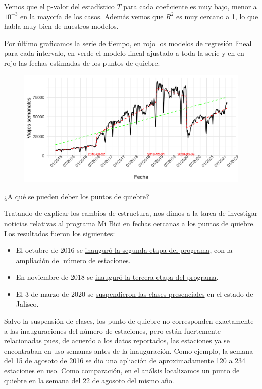 \documentclass[
]{article}
\begin{document}
Vemos que el p-valor del estadístico \(T\) para cada coeficiente es muy
bajo, menor a \(10^{-3}\) en la mayoría de los casos. Además vemos que
\(R^2\) es muy cercano a 1, lo que habla muy bien de nuestros modelos.

Por último graficamos la serie de tiempo, en rojo los modelos de
regresión lineal para cada intervalo, en verde el modelo lineal ajustado
a toda la serie y en en rojo las fechas estimadas de los puntos de
quiebre.

\begin{figure}
\centering
\includegraphics[width=12cm]{../plots/serie_breaks.png}
\end{figure}

¿A qué se pueden deber los puntos de quiebre?

Tratando de explicar los cambios de estructura, nos dimos a la tarea de
investigar noticias relativas al programa Mi Bici en fechas cercanas a
los puntos de quiebre. Los resultados fueron los siguientes:

\begin{itemize}
\item
  El octubre de 2016 se
  \href{https://www.informador.mx/Jalisco/Inauguran-segunda-etapa-de-MiBici-20161027-0035.html}{inauguró
  la segunda etapa del programa}, con la ampliación del número de
  estaciones.
\item
  En noviembre de 2018 se
  \href{https://www.eloccidental.com.mx/local/inauguran-tercera-etapa-de-mibici-2714371.html}{inauguró
  la tercera etapa del programa}.
\item
  El 3 de marzo de 2020 se
  \href{https://www.animalpolitico.com/2020/03/jalisco-suspende-clases-universidades-eventos-masivos-coronavirus/}{suspendieron
  las clases presenciales} en el estado de Jalisco.
\end{itemize}

Salvo la suspensión de clases, los punto de quiebre no corresponden
exactamente a las inauguraciones del número de estaciones, pero están
fuertemente relacionadas pues, de acuerdo a los datos reportados, las
estaciones ya se encontraban en uso semanas antes de la inauguración.
Como ejemplo, la semana del 15 de agosoto de 2016 se dio una apliación
de aproximadamente 120 a 234 estaciones en uso. Como comparación, en el
análsis localizamos un punto de quiebre en la semana del 22 de agosoto
del mismo año.
\end{document}
